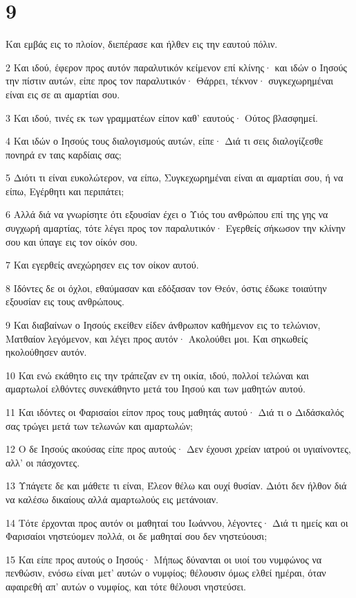 \chapter{9}

\par Και εμβάς εις το πλοίον, διεπέρασε και ήλθεν εις την εαυτού πόλιν.
\par 2 Και ιδού, έφερον προς αυτόν παραλυτικόν κείμενον επί κλίνης· και ιδών ο Ιησούς την πίστιν αυτών, είπε προς τον παραλυτικόν· Θάρρει, τέκνον· συγκεχωρημέναι είναι εις σε αι αμαρτίαι σου.
\par 3 Και ιδού, τινές εκ των γραμματέων είπον καθ' εαυτούς· Ούτος βλασφημεί.
\par 4 Και ιδών ο Ιησούς τους διαλογισμούς αυτών, είπε· Διά τι σεις διαλογίζεσθε πονηρά εν ταις καρδίαις σας;
\par 5 Διότι τι είναι ευκολώτερον, να είπω, Συγκεχωρημέναι είναι αι αμαρτίαι σου, ή να είπω, Εγέρθητι και περιπάτει;
\par 6 Αλλά διά να γνωρίσητε ότι εξουσίαν έχει ο Υιός του ανθρώπου επί της γης να συγχωρή αμαρτίας, τότε λέγει προς τον παραλυτικόν· Εγερθείς σήκωσον την κλίνην σου και ύπαγε εις τον οίκόν σου.
\par 7 Και εγερθείς ανεχώρησεν εις τον οίκον αυτού.
\par 8 Ιδόντες δε οι όχλοι, εθαύμασαν και εδόξασαν τον Θεόν, όστις έδωκε τοιαύτην εξουσίαν εις τους ανθρώπους.
\par 9 Και διαβαίνων ο Ιησούς εκείθεν είδεν άνθρωπον καθήμενον εις το τελώνιον, Ματθαίον λεγόμενον, και λέγει προς αυτόν· Ακολούθει μοι. Και σηκωθείς ηκολούθησεν αυτόν.
\par 10 Και ενώ εκάθητο εις την τράπεζαν εν τη οικία, ιδού, πολλοί τελώναι και αμαρτωλοί ελθόντες συνεκάθηντο μετά του Ιησού και των μαθητών αυτού.
\par 11 Και ιδόντες οι Φαρισαίοι είπον προς τους μαθητάς αυτού· Διά τι ο Διδάσκαλός σας τρώγει μετά των τελωνών και αμαρτωλών;
\par 12 Ο δε Ιησούς ακούσας είπε προς αυτούς· Δεν έχουσι χρείαν ιατρού οι υγιαίνοντες, αλλ' οι πάσχοντες.
\par 13 Υπάγετε δε και μάθετε τι είναι, Έλεον θέλω και ουχί θυσίαν. Διότι δεν ήλθον διά να καλέσω δικαίους αλλά αμαρτωλούς εις μετάνοιαν.
\par 14 Τότε έρχονται προς αυτόν οι μαθηταί του Ιωάννου, λέγοντες· Διά τι ημείς και οι Φαρισαίοι νηστεύομεν πολλά, οι δε μαθηταί σου δεν νηστεύουσι;
\par 15 Και είπε προς αυτούς ο Ιησούς· Μήπως δύνανται οι υιοί του νυμφώνος να πενθώσιν, ενόσω είναι μετ' αυτών ο νυμφίος; θέλουσιν όμως ελθεί ημέραι, όταν αφαιρεθή απ' αυτών ο νυμφίος, και τότε θέλουσι νηστεύσει.
